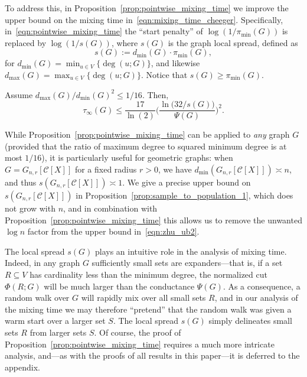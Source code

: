 \documentclass[twoside,11pt]{article}
\newcommand{\1}{\mathbf{1}}
\newcommand{\mc}[1]{\mathcal{#1}}
\begin{document}
To address this, in Proposition~\ref{prop:pointwise_mixing_time} we improve the upper bound on the mixing time in~\eqref{eqn:mixing_time_cheeger}. Specifically, in~\eqref{eqn:pointwise_mixing_time} the ``start penalty'' of $\log(1/\pi_{\min}(G))$ is replaced by $\log(1/s(G))$, where $s(G)$ is the graph local spread, defined as
\begin{equation*}
s(G) := d_{\min}(G) \cdot \pi_{\min}(G),
\end{equation*}
for $d_{\min}(G) = \min_{u \in V}\bigl\{\deg(u;G)\bigr\}$, and likewise $d_{\max}(G) = \max_{u \in V}\bigl\{\deg(u;G)\bigr\}$. Notice that $s(G) \geq \pi_{\min}(G)$.
\begin{proposition}
	\label{prop:pointwise_mixing_time}
	Assume $d_{\max}(G)/d_{\min}(G)^2 \leq 1/16$. Then,
	\begin{equation}
	\label{eqn:pointwise_mixing_time}
	\tau_{\infty}(G) \leq \frac{17}{\ln(2)} \biggl(\frac{\ln\bigl(32/s(G)\bigr)}{\Psi(G)}\biggr)^2.
	\end{equation}
\end{proposition}

While Proposition~\ref{prop:pointwise_mixing_time} can be applied to \emph{any} graph $G$ (provided that the ratio of maximum degree to squared minimum degree is at most $1/16$), it is particularly useful for geometric graphs: when $G = G_{n,r}[\mc{C}[X]]$ for a fixed radius $r > 0$, we have $d_{\min}(G_{n,r}[\mc{C}[X]]) \asymp n$, and thus $s(G_{n,r}[\mc{C}[X]]) \asymp 1$. We give a precise upper bound on $s(G_{n,r}[\mc{C}[X]])$ in Proposition~\ref{prop:sample_to_population_1}, which does not grow with $n$, and in combination with Proposition~\ref{prop:pointwise_mixing_time} this allows us to remove the unwanted $\log n$ factor from the upper bound in~\eqref{eqn:zhu_ub2}. 

The local spread $s(G)$ plays an intuitive role in the analysis of mixing time. Indeed, in any graph $G$ sufficiently small sets are expanders---that is, if a set $R \subseteq V$ has cardinality less than the minimum degree, the normalized cut $\Phi(R;G)$ will be much larger than the conductance $\Psi(G)$. As a consequence, a random walk over $G$ will rapidly mix over all small sets $R$, and in our analysis of the mixing time we may therefore ``pretend'' that the random walk was given a warm start over a larger set $S$. The local spread $s(G)$ simply delineates small sets $R$ from larger sets $S$. Of course, the proof of Proposition~\ref{prop:pointwise_mixing_time} requires a much more intricate analysis, and---as with the proofs of all results in this paper---it is deferred to the appendix.
\end{document}
